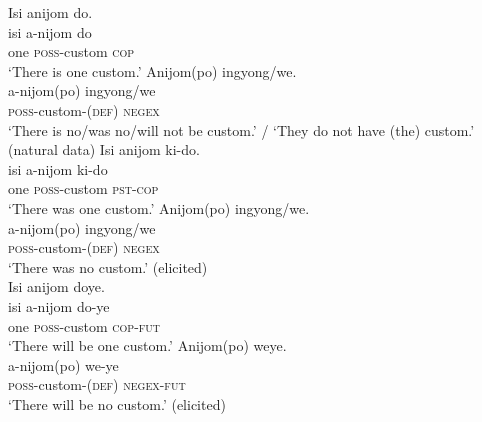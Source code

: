 \documentclass[output=paper,colorlinks,citecolor=brown]{langscibook}
\begin{document}
\ea\label{ex:amr:22}
        \ea\label{ex:amr:22a}Isi anijom do.  \\ 
            \gll isi a-nijom do \\
                  one \textsc{poss}{}-custom \textsc{cop} \\
            \glt ‘There is one custom.’ 
        \ex\label{ex:amr:22b} Anijom(po) ingyong/we. \\
            \gll a-nijom(po) ingyong/we\\
                  \textsc{poss}{}-custom-(\textsc{def}) \textsc{negex} \\
            \glt ‘There is no/was no/will not be custom.’ / ‘They do not have (the) custom.’ (natural data)
       \z
\z
\ea\label{ex:amr:23}
        \ea\label{ex:amr:23a} Isi anijom ki-do.  \\ 
            \gll isi a-nijom ki-do \\
                  one \textsc{poss}{}-custom \textsc{pst}{}-\textsc{cop} \\
            \glt ‘There was one custom.’ 
        \ex\label{ex:amr:23b}Anijom(po) ingyong/we.  \\
            \gll a-nijom(po) ingyong/we \\
                  \textsc{poss}{}-custom-(\textsc{def}) \textsc{negex} \\
            \glt ‘There was no custom.’ (elicited)\\
        \z
    \z
\ea\label{ex:amr:24}
        \ea\label{ex:amr:24a} Isi anijom doye.  \\
            \gll isi a-nijom do-ye \\
                  one \textsc{poss}{}-custom \textsc{cop-fut} \\
            \glt  ‘There will be one custom.'
        \ex\label{ex:amr:24b} Anijom(po) weye.  \\
            \gll  a-nijom(po) we-ye \\
                  \textsc{poss}{}-custom-(\textsc{def}) \textsc{negex-fut} \\
            \glt ‘There will be no custom.’ (elicited)
        \z 
    \z 
\end{document}
